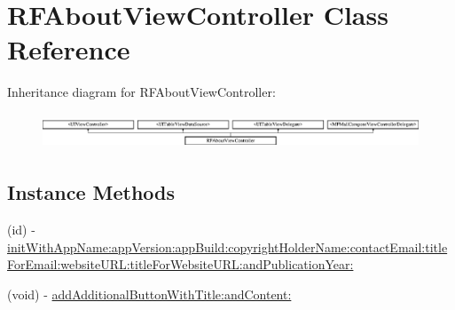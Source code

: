 \hypertarget{interface_r_f_about_view_controller}{}\section{R\+F\+About\+View\+Controller Class Reference}
\label{interface_r_f_about_view_controller}
Inheritance diagram for R\+F\+About\+View\+Controller\+:\begin{figure}[H]
\begin{center}
\leavevmode
\includegraphics[height=1.064639cm]{interface_r_f_about_view_controller}
\end{center}
\end{figure}
\subsection*{Instance Methods}
\begin{DoxyCompactItemize}
\item 
(id) -\/ \hyperlink{interface_r_f_about_view_controller_ab644d0fbddef1d0d280226e679122199}{init\+With\+App\+Name\+:app\+Version\+:app\+Build\+:copyright\+Holder\+Name\+:contact\+Email\+:title\+For\+Email\+:website\+U\+R\+L\+:title\+For\+Website\+U\+R\+L\+:and\+Publication\+Year\+:}
\item 
(void) -\/ \hyperlink{interface_r_f_about_view_controller_a70a60acecc6355d244903265cd83ba31}{add\+Additional\+Button\+With\+Title\+:and\+Content\+:}
\end{DoxyCompactItemize}

